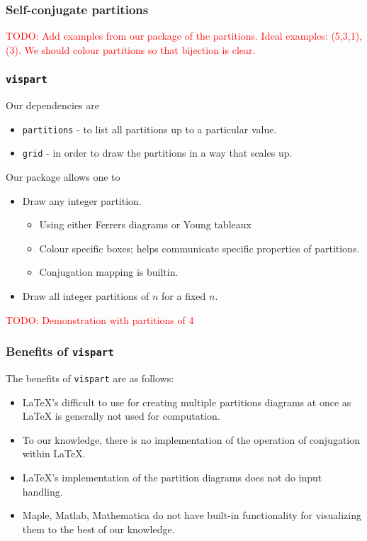 \documentclass{beamer}
\newcommand*{\TODO}[1]{\textcolor{red}{TODO: #1}}
\begin{document}
\begin{frame}
\frametitle{Self-conjugate partitions}
\TODO{Add examples from our package of the partitions. Ideal examples: (5,3,1), (3). We should colour partitions so that bijection is clear.}
\end{frame}

\begin{frame}
\frametitle{\texttt{vispart} }	
Our dependencies are 
\begin{itemize}
\item \texttt{partitions} - to list all partitions up to a particular value.
\item \texttt{grid} - in order to draw the partitions in a way that scales up.
\end{itemize}	

Our package allows one to 
\begin{itemize}
\item Draw any integer partition.
\begin{itemize}
\item Using either Ferrers diagrams or Young tableaux
\item Colour specific boxes; helps communicate specific properties of partitions.
\item Conjugation mapping is builtin.
\end{itemize}
\item Draw all integer partitions of $n$ for a fixed $n$.
\end{itemize}

\TODO{Demonstration with partitions of 4}

\end{frame}

\begin{frame}
\frametitle{Benefits of \texttt{vispart}}	
The benefits of \texttt{vispart} are as follows:

\begin{itemize}
	\item LaTeX's difficult to use for creating multiple partitions diagrams at once as LaTeX is generally not used for computation.
	\item To our knowledge, there is no implementation of the operation of conjugation within LaTeX.
	\item LaTeX's implementation of the partition diagrams does not do input handling.
	\item Maple, Matlab, Mathematica do not have built-in functionality for visualizing them to the best of our knowledge.
\end{itemize}
\end{frame}
\end{document}
